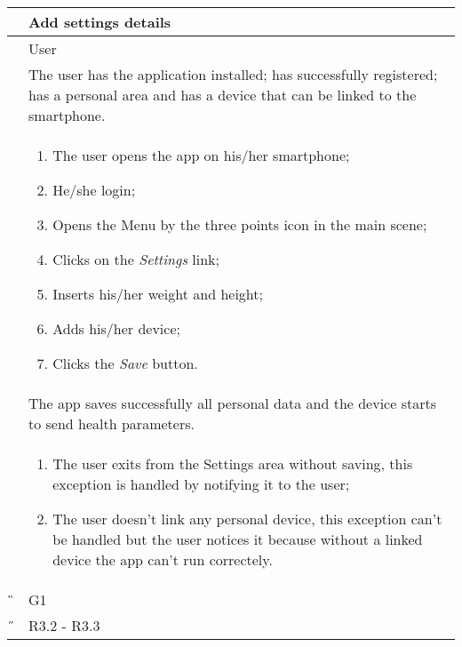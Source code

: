 \begin{center}
	\begin{longtable}{ | p{} | p{} | }
		\hline
		 \A &   Add settings details\\ 

		\hline
		 \B &  User \\ 

		\hline
  		 \C &  The user has the application installed; has successfully registered; has a personal area and has a device that can be linked to the smartphone.\\ 

		\hline
		\D & \begin{enumerate}
			\item The user opens the app on his/her smartphone;
			\item He/she login;
			\item Opens the Menu by the three points icon in the main scene;
			\item Clicks on the \textit{Settings} link;
			\item Inserts his/her weight and height;
			\item Adds his/her device;
			\item Clicks the \textit{Save} button.
		\end{enumerate} \\

		\hline
		\E & The app saves successfully all personal data and the device starts to send health parameters.\\

		\hline
		\F & \begin{enumerate}
			\item The user exits from the Settings area without saving, this exception is handled by notifying it to the user;
			\item The user doesn't link any personal device, this exception can't be handled but the user notices it because 					without a linked device the app can't run correctely.
		\end{enumerate} \\
		
		\hline
		\G & G1\\

		\hline
		\H & R3.2 - R3.3 \\
		\hline

	\end{longtable}
\end{center}